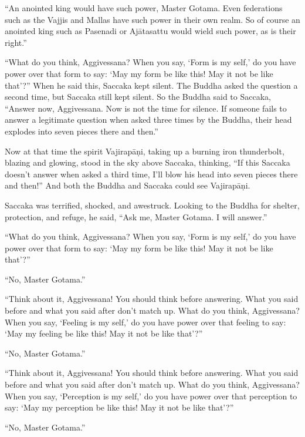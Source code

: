 \documentclass[12pt,openany]{book}%
\begin{document}
“An anointed king would have such power, Master Gotama. Even federations such as the Vajjis and Mallas have such power in their own realm. So of course an anointed king such as Pasenadi or \textsanskrit{Ajātasattu} would wield such power, as is their right.” 

“What do you think, Aggivessana? When you say, ‘Form is my self,’ do you have power over that form to say: ‘May my form be like this! May it not be like that’?” When he said this, Saccaka kept silent. The Buddha asked the question a second time, but Saccaka still kept silent. So the Buddha said to Saccaka, “Answer now, Aggivessana. Now is not the time for silence. If someone fails to answer a legitimate question when asked three times by the Buddha, their head explodes into seven pieces there and then.” 

Now at that time the spirit \textsanskrit{Vajirapāṇi}, taking up a burning iron thunderbolt, blazing and glowing, stood in the sky above Saccaka, thinking, “If this Saccaka doesn’t answer when asked a third time, I’ll blow his head into seven pieces there and then!” And both the Buddha and Saccaka could see \textsanskrit{Vajirapāṇi}. 

Saccaka was terrified, shocked, and awestruck. Looking to the Buddha for shelter, protection, and refuge, he said, “Ask me, Master Gotama. I will answer.” 

“What do you think, Aggivessana? When you say, ‘Form is my self,’ do you have power over that form to say: ‘May my form be like this! May it not be like that’?” 

“No, Master Gotama.” 

“Think about it, Aggivessana! You should think before answering. What you said before and what you said after don’t match up. What do you think, Aggivessana? When you say, ‘Feeling is my self,’ do you have power over that feeling to say: ‘May my feeling be like this! May it not be like that’?” 

“No, Master Gotama.” 

“Think about it, Aggivessana! You should think before answering. What you said before and what you said after don’t match up. What do you think, Aggivessana? When you say, ‘Perception is my self,’ do you have power over that perception to say: ‘May my perception be like this! May it not be like that’?” 

“No, Master Gotama.” 
\end{document}
